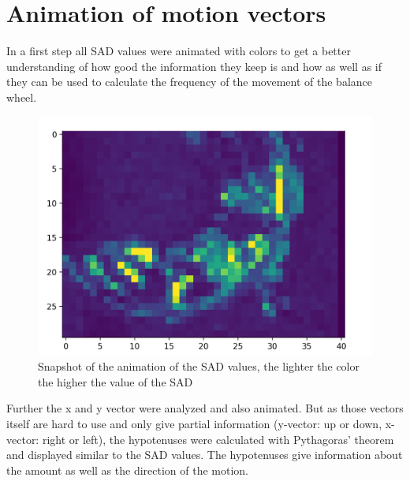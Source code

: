 \documentclass[12pt, a4paper]{report}
\begin{document}
    \section{Animation of motion vectors}
    
    In a first step all SAD values were animated with colors to get a better understanding of how good the information they keep is and how as well as if they can be used to calculate the frequency of the movement of the balance wheel.
    
    \noindent
    \begin{figure}[H]
    \centering
    \includegraphics[scale=0.6]{Images/animation_sad.png}
    
    \caption{Snapshot of the animation of the SAD values, the lighter the color the higher the value of the SAD}
    \end{figure}
     
    Further the x and y vector were analyzed and also animated. But as those vectors itself are hard to use and only give partial information (y-vector: up or down, x-vector: right or left), the hypotenuses were calculated with Pythagoras' theorem and displayed similar to the SAD values. The hypotenuses give information about the amount as well as the direction of the motion.
    
\end{document}
